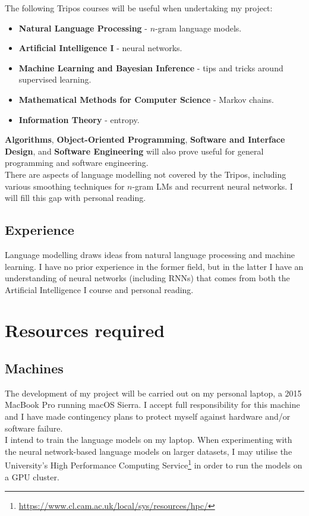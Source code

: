 \documentclass[a4paper, 12pt]{article}
\newcommand{\tbf}[1]{\textbf{#1}}
\newcommand{\hlink}[2]{{\href{#1}{#2}}}
\begin{document}
The following Tripos courses will be useful when undertaking my project:
\begin{itemize}
\item
	\tbf{Natural Language Processing} - $n$-gram language models.
\item
	\tbf{Artificial Intelligence I} - neural networks.
\item
	\tbf{Machine Learning and Bayesian Inference} - tips and tricks around supervised learning.
\item
	\tbf{Mathematical Methods for Computer Science} - Markov chains.
\item
	\tbf{Information Theory} - entropy.
\end{itemize}
\tbf{Algorithms}, \tbf{Object-Oriented Programming}, \tbf{Software and Interface Design}, and \tbf{Software Engineering} will also prove useful for general programming and software engineering. \\

There are aspects of language modelling not covered by the Tripos, including various smoothing techniques for $n$-gram LMs and recurrent neural networks. I will fill this gap with personal reading.

\subsection*{Experience}
Language modelling draws ideas from natural language processing and machine learning. I have no prior experience in the former field, but in the latter I have an understanding of neural networks (including RNNs) that comes from both the Artificial Intelligence I course and personal reading. \\

\section*{Resources required}

\subsection*{Machines}
The development of my project will be carried out on my personal laptop, a 2015 MacBook Pro running macOS Sierra. I accept full responsibility for this machine and I have made contingency plans to protect myself against hardware and/or software failure. \\

I intend to train the language models on my laptop. When experimenting with the neural network-based language models on larger datasets, I may utilise the University's High Performance Computing Service\footnote{\hlink{https://www.cl.cam.ac.uk/local/sys/resources/hpc/}{https://www.cl.cam.ac.uk/local/sys/resources/hpc/}} in order to run the models on a GPU cluster.
\end{document}
